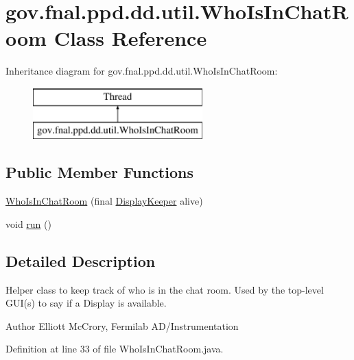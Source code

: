 \hypertarget{classgov_1_1fnal_1_1ppd_1_1dd_1_1util_1_1WhoIsInChatRoom}{\section{gov.\-fnal.\-ppd.\-dd.\-util.\-Who\-Is\-In\-Chat\-Room Class Reference}
\label{classgov_1_1fnal_1_1ppd_1_1dd_1_1util_1_1WhoIsInChatRoom}
}
Inheritance diagram for gov.\-fnal.\-ppd.\-dd.\-util.\-Who\-Is\-In\-Chat\-Room\-:\begin{figure}[H]
\begin{center}
\leavevmode
\includegraphics[height=2.000000cm]{classgov_1_1fnal_1_1ppd_1_1dd_1_1util_1_1WhoIsInChatRoom}
\end{center}
\end{figure}
\subsection*{Public Member Functions}
\begin{DoxyCompactItemize}
\item 
\hyperlink{classgov_1_1fnal_1_1ppd_1_1dd_1_1util_1_1WhoIsInChatRoom_aa1f28f08a939bd49a1fc52d048aa1ea3}{Who\-Is\-In\-Chat\-Room} (final \hyperlink{interfacegov_1_1fnal_1_1ppd_1_1dd_1_1util_1_1DisplayKeeper}{Display\-Keeper} alive)
\item 
void \hyperlink{classgov_1_1fnal_1_1ppd_1_1dd_1_1util_1_1WhoIsInChatRoom_a90ed5ae5ed8c32c729d0162964b9a668}{run} ()
\end{DoxyCompactItemize}


\subsection{Detailed Description}
Helper class to keep track of who is in the chat room. Used by the top-\/level G\-U\-I(s) to say if a Display is available.

\begin{DoxyAuthor}{Author}
Elliott Mc\-Crory, Fermilab A\-D/\-Instrumentation 
\end{DoxyAuthor}


Definition at line 33 of file Who\-Is\-In\-Chat\-Room.\-java.



